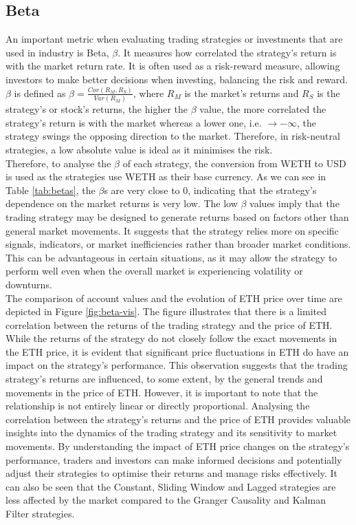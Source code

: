 \subsection{Beta}
An important metric when evaluating trading strategies or investments that are used in industry is Beta, $\beta$. It measures how correlated the strategy's return is with the market return rate. It is often used as a risk-reward measure, allowing investors to make better decisions when investing, balancing the risk and reward. $\beta$ is defined as $\beta = \frac{Cov(R_M, R_S)}{Var(R_M)}$, where $R_M$ is the market's returns and $R_S$ is the strategy's or stock's returns, the higher the $\beta$ value, the more correlated the strategy's return is with the market whereas a lower one, i.e. $\rightarrow - \infty$, the strategy swings the opposing direction to the market. Therefore, in risk-neutral strategies, a low absolute value is ideal as it minimises the risk.
\\[3mm]
Therefore, to analyse the $\beta$ of each strategy, the conversion from WETH to USD is used as the strategies use WETH as their base currency. As we can see in Table \ref{tab:betas}, the $\beta$s are very close to 0, indicating that the strategy's dependence on the market returns is very low. The low $\beta$ values imply that the trading strategy may be designed to generate returns based on factors other than general market movements. It suggests that the strategy relies more on specific signals, indicators, or market inefficiencies rather than broader market conditions. This can be advantageous in certain situations, as it may allow the strategy to perform well even when the overall market is experiencing volatility or downturns.
\\[3mm]
The comparison of account values and the evolution of ETH price over time are depicted in Figure \ref{fig:beta-vis}. The figure illustrates that there is a limited correlation between the returns of the trading strategy and the price of ETH. While the returns of the strategy do not closely follow the exact movements in the ETH price, it is evident that significant price fluctuations in ETH do have an impact on the strategy's performance. This observation suggests that the trading strategy's returns are influenced, to some extent, by the general trends and movements in the price of ETH. However, it is important to note that the relationship is not entirely linear or directly proportional. Analysing the correlation between the strategy's returns and the price of ETH provides valuable insights into the dynamics of the trading strategy and its sensitivity to market movements. By understanding the impact of ETH price changes on the strategy's performance, traders and investors can make informed decisions and potentially adjust their strategies to optimise their returns and manage risks effectively. It can also be seen that the Constant, Sliding Window and Lagged strategies are less affected by the market compared to the Granger Causality and Kalman Filter strategies.

